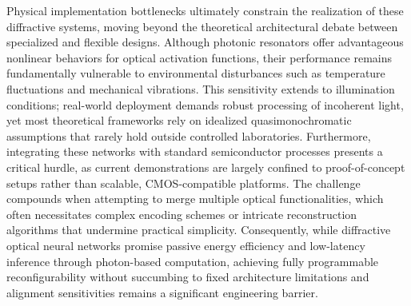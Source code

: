 Physical implementation bottlenecks ultimately constrain the realization of these diffractive systems, moving beyond the theoretical architectural debate between specialized and flexible designs. Although photonic resonators offer advantageous nonlinear behaviors for optical activation functions, their performance remains fundamentally vulnerable to environmental disturbances such as temperature fluctuations and mechanical vibrations. This sensitivity extends to illumination conditions; real-world deployment demands robust processing of incoherent light, yet most theoretical frameworks rely on idealized quasimonochromatic assumptions that rarely hold outside controlled laboratories. Furthermore, integrating these networks with standard semiconductor processes presents a critical hurdle, as current demonstrations are largely confined to proof-of-concept setups rather than scalable, CMOS-compatible platforms. The challenge compounds when attempting to merge multiple optical functionalities, which often necessitates complex encoding schemes or intricate reconstruction algorithms that undermine practical simplicity. Consequently, while diffractive optical neural networks promise passive energy efficiency and low-latency inference through photon-based computation, achieving fully programmable reconfigurability without succumbing to fixed architecture limitations and alignment sensitivities remains a significant engineering barrier. \citep{doi_10_3390_nano14080697_c372a140} \citep{doi_10_1364_oe_523619_ddeb1b53} \citep{doi_10_1038_s41467_022_28702_0_1b79b43c} \citep{doi_10_1364_optica_583686_6b84680e} \citep{doi_10_1002_lpor_202200348_d54cae18}

